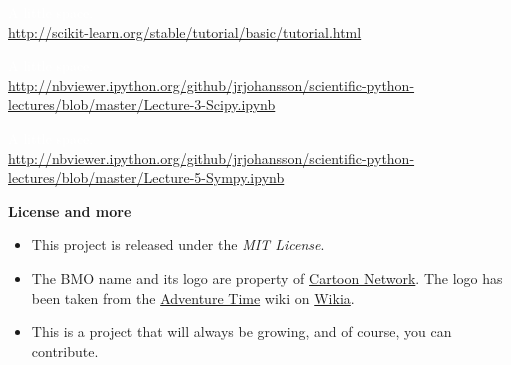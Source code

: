 \begin{description}
\normalsize
\item[scikit-learn] \textcolor{white}{A little space.} \\
\small
\url{http://scikit-learn.org/stable/tutorial/basic/tutorial.html}

\normalsize
\item[scipy] \textcolor{white}{A little space.} \\
\small
\url{http://nbviewer.ipython.org/github/jrjohansson/scientific-python-lectures/blob/master/Lecture-3-Scipy.ipynb}

\normalsize
\item[simpy] \textcolor{white}{A little space.} \\
\small
\url{http://nbviewer.ipython.org/github/jrjohansson/scientific-python-lectures/blob/master/Lecture-5-Sympy.ipynb}
\end{description}

\pagebreak

\Large
\textbf{License and more}

\normalsize
\begin{itemize}
\item[\textbullet]This project is released under the \emph{MIT License}.
\item[\textbullet]The BMO name and its logo are property of \href{http://www.cartoonnetwork.com/}{Cartoon Network}. The logo has been taken from the \href{http://adventuretime.wikia.com/}{Adventure Time} wiki on \href{http://www.wikia.com/}{Wikia}.
\item[\textbullet]This is a project that will always be growing, and of course, you can contribute.
\end{itemize}
